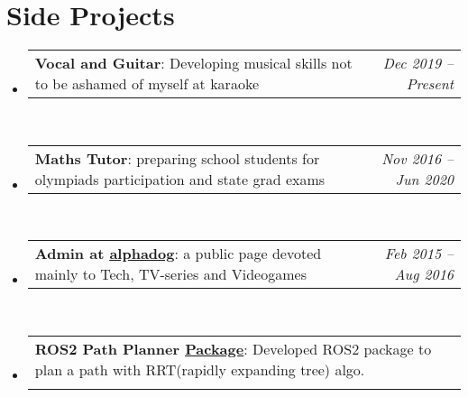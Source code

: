 \documentclass[a4paper,11pt]{article}
\makeatletter
\newcommand{\resumeProjectHeading}[2]{
    \item
    \begin{tabular*}{0.97\textwidth}{l@{\extracolsep{\fill}}r}
      \small#1 & #2 \\
    \end{tabular*}\vspace{-7pt}
}
\newcommand{\resumeSubHeadingListStart}{\begin{itemize}[leftmargin=0.15in, label={}]}
\newcommand{\resumeSubHeadingListEnd}{\end{itemize}}
\makeatother
\begin{document}
\section{Side Projects}
\resumeSubHeadingListStart
      
      \resumeProjectHeading
      {\textbf{Vocal and Guitar}{: Developing musical skills not to be ashamed of myself at karaoke}}{\emph{Dec 2019 -- Present}} \\
      
      \resumeProjectHeading
      {\textbf{Maths Tutor}{: preparing school students for olympiads participation and state grad exams}}{\emph{Nov 2016 -- Jun 2020}} \\
      
      \resumeProjectHeading
      {\textbf{Admin at \href{https://vk.com/alpha_dogs}{\underline{alphadog}}}{: a public page devoted mainly to Tech, TV-series and Videogames}}{\emph{Feb 2015 -- Aug 2016}} \\
      
      \resumeProjectHeading
      {\textbf{ROS2 Path Planner \href{https://github.com/aaptss/route_planning_ros2}{\underline{Package}}}{: Developed ROS2 package to plan a path with RRT(rapidly expanding tree) algo. }}\\

\resumeSubHeadingListEnd

\end{document}
